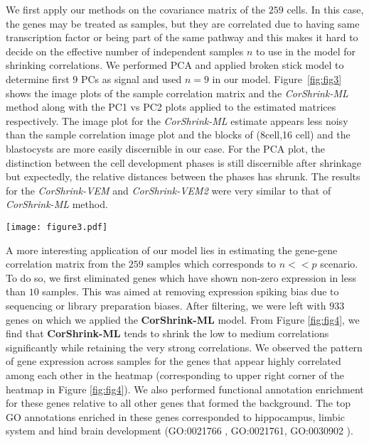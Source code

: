 We first apply our methods on the covariance matrix of the $259$ cells. In this case, the genes may be treated as  samples, but they are correlated due to having same transcription factor or being part of the same pathway and this makes it hard to decide on the effective number of independent samples $n$ to use in the model for shrinking correlations. We performed PCA and applied broken stick model to determine first $9$ PCs as signal and used $n=9$ in our model. Figure~\ref{fig:fig3}  shows the image plots of the sample correlation matrix and the \textit{CorShrink-ML} method along with the PC1 vs PC2 plots applied to the estimated matrices respectively. The image plot for the \textit{CorShrink-ML} estimate appears less noisy than the sample correlation image plot and the blocks of (8cell,16 cell) and the blastocysts are more easily discernible in our case. For the PCA plot, the distinction between the cell development phases is still discernible after shrinkage but expectedly, the relative distances between the phases has shrunk. The results for the \textit{CorShrink-VEM} and \textit{CorShrink-VEM2} were very similar to that of \textit{CorShrink-ML} method.

\begin{figure*}[ht]
\raggedleft
\texttt{[image: figure3.pdf]}
 \caption{\small{The image plot and the PC1 vs PC2 plot of the sample correlation matrix and the estimated correlation matrix obtained using \textit{CorShrink-ML} method.}}
\label{fig:fig3}
\end{figure*}


A more interesting application of our model lies in estimating the gene-gene correlation matrix from the $259$ samples which corresponds to $n << p$ scenario. To do so, we first eliminated genes which have shown non-zero expression in less than $10$ samples. This was aimed at removing expression spiking bias due to sequencing or library preparation biases. After filtering, we were left with $933$ genes on which we applied the \textbf{CorShrink-ML} model. From Figure \ref{fig:fig4}, we find that \textbf{CorShrink-ML} tends to shrink the low to medium correlations significantly while retaining the very strong correlations. We observed the pattern of gene expression across samples for the genes that appear highly correlated among each other in the heatmap (corresponding to upper right corner of the heatmap in Figure \ref{fig:fig4}). We also performed functional annotation enrichment for these genes relative to all other genes that formed the background. The top GO annotations enriched in these genes corresponded to hippocampus,  limbic system and hind brain development (GO:0021766 , GO:0021761,  GO:0030902 ). 

